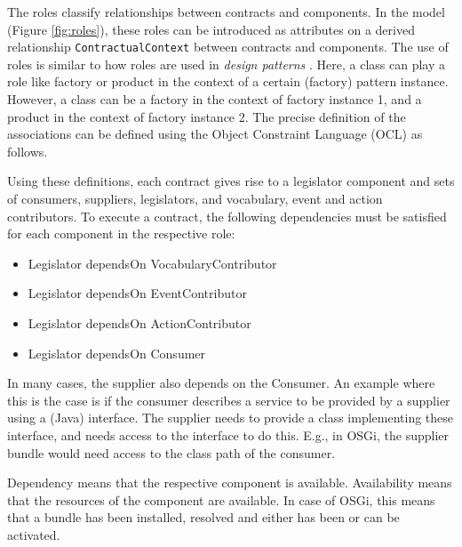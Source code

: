 \documentclass{llncs}
\begin{document}
The roles classify relationships between contracts and components. In the model (Figure \ref{fig:roles}), these roles can be introduced as attributes on a derived relationship \texttt{ContractualContext} between contracts and components. The use of roles is similar to how roles are used in \textit{design patterns} \cite{GangOf4} \cite{riehle:roleModels}. Here, a class can play a role like factory or product in the context of a certain (factory) pattern instance. However, a class can be a factory in the context of factory instance 1, and a product in the context of factory instance 2. The precise definition of the associations can be defined using the Object Constraint Language (OCL) \cite{OCL20} as follows. 

\lstset{ language=OCL }


Using these definitions, each contract gives rise to a legislator component and sets of consumers, suppliers, legislators, and vocabulary, event and action contributors. To execute a contract, the following dependencies must be satisfied for each component in the respective role: 

\begin{itemize}
  \item Legislator dependsOn VocabularyContributor
  \item Legislator dependsOn EventContributor
  \item Legislator dependsOn ActionContributor
  \item Legislator dependsOn Consumer
\end{itemize}

In many cases, the supplier also depends on the Consumer. An example where this is the case is if the consumer describes a service to be provided by a supplier using a (Java) interface. The supplier needs to provide a class implementing these interface, and needs access to the interface to do this. E.g., in OSGi, the supplier bundle would need access to the class path of the consumer. 

Dependency means that the respective component is available. Availability means that the resources of the component are available. In case of OSGi, this means that a bundle has been installed, resolved and either has been or can be activated. 
\end{document}
